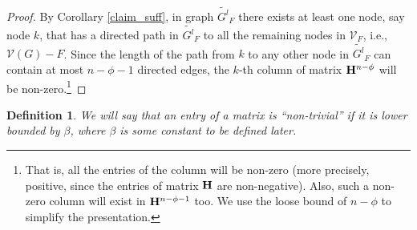 \documentclass[letterpaper, 11pt]{article}
\newtheorem{definition}{Definition}[section]
\newcommand{\calV}{{\mathcal{V}}}
\begin{document}
\begin{proof}
By Corollary \ref{claim_suff}, in graph $\widetilde{G^l}_F$ there exists at least one node, say
node $k$, that has a directed path in $\widetilde{G^l}_F$ to all the remaining nodes in $\calV_F$, i.e., $\calV(G)-F$.
Since the length of the path from $k$ to any other node in $\widetilde{G^l}_F$ can contain
at most $n-\phi-1$ directed edges,
the $k$-th column of matrix ${{\bf{H}}^{n-\phi}}$ will
be non-zero.\footnote{That is, all the entries of the column will be
non-zero (more precisely, positive, since the entries of matrix $\bf{H}$
are non-negative).
Also, such a non-zero column will exist in ${\bf H}^{n-\phi-1}$ too.
We use the loose bound of $n-\phi$ to simplify the presentation. }
\end{proof}


\begin{definition}
We will say that an entry of a matrix is ``non-trivial'' if it is lower
bounded by $\beta$, where $\beta$ is some constant to be defined later.
\end{definition}
\end{document}
